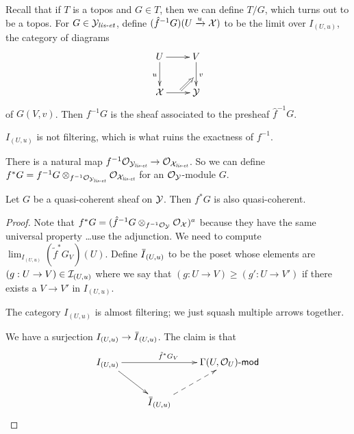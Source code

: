 Recall that if $T$ is a topos and $G\in T$, then we can define $T/G$,
which turns out to be a topos. For $G\in \mathcal{Y}_{\text{\it lis-et}} $, define $(\hat
f^{-1} G)(U\xrightarrow u \mathcal{X})$ to be the limit over $I_{(U,u)}$, the
category of diagrams
 \[\xymatrix{U\ar[d]_u \ar[r] & V\ar[d]^v_{}="b"\\
 \X\ar[r]^{}="a" & \Y \ar@{=>} "a";"b"}
 \]
 of $G(V,v)$. Then $f^{-1}G$ is the sheaf associated to the presheaf
$\hat f^{-1}G$.
\begin{remark}
  $I_{(U,u)}$ is not filtering, which is what ruins the exactness of
$f^{-1}$.
\end{remark}
\begin{remark}
  There is a natural map $f^{-1}\mathcal{O}_{\mathcal{Y}_{\text{\it lis-et}} }\to \mathcal{O}_{\mathcal{X}_{\text{\it lis-et}} }$.
So we can define $f^*G=f^{-1}G\otimes_{f^{-1}\mathcal{O}_{\mathcal{Y}_{\text{\it lis-et}}
}}\mathcal{O}_{\mathcal{X}_{\text{\it lis-et}} }$ for an $\mathcal{O}_{\mathcal{Y}}$-module $G$.
\end{remark}
\begin{proposition}
  Let $G$ be a quasi-coherent sheaf on $\mathcal{Y}$. Then $f^*G$ is also
quasi-coherent.
\end{proposition}
\begin{proof}
  Note that $f^*G=(\hat f^{-1}G\otimes_{f^{-1}\mathcal{O}_{\mathcal{Y}}} \mathcal{O}_{\mathcal{X}})^a$
because they have the same universal property \dots use the
adjunction. We need to compute $\lim_{I_{(U,u)}} (\tilde f^*
G_V)(U)$. Define $\bbar I_{(U,u)}$ to be the poset whose elements are
$(g:U\to V)\in \mathcal{I}_{(U,u)}$ where we say that $(g:U\to V)\ge (g':U\to
V')$ if there exists a $V\to V'$ in $I_{(U,u)}$.

  The category $I_{(U,u)}$ is almost filtering; we just squash
multiple arrows together.

  We have a surjection $I_{(U,u)}\to \bbar I_{(U,u)}$. The claim is
that
  \[\xymatrix{
   I_{(U,u)}\ar[dr]\ar[rr]^{\tilde f^*G_V} & & \Ga(U,\O_U)\mod\\
   & \bbar I_{(U,u)}\ar@{-->}[ur]
  }\]
\end{proof}
